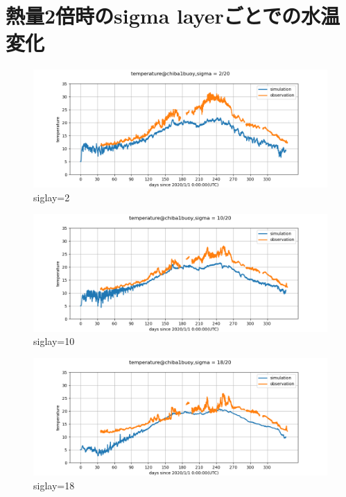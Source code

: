 \documentclass[12pt,a4paper]{jarticle}
\begin{document}
\newpage
\section{熱量2倍時のsigma layerごとでの水温変化}
\begin{figure}[hbtp]
    \centering
        \includegraphics[keepaspectratio,scale=0.5]{Tokyo3/temperature_chiba1buoy_2_Tokyo3.png}
    \caption{siglay=2}
\end{figure}

\begin{figure}[hbtp]
    \centering
        \includegraphics[keepaspectratio,scale=0.5]{Tokyo3/temperature_chiba1buoy_10_Tokyo3.png}
    \caption{siglay=10}
\end{figure}

\begin{figure}[hbtp]
    \centering
        \includegraphics[keepaspectratio,scale=0.5]{Tokyo3/temperature_chiba1buoy_18_Tokyo3.png}
    \caption{siglay=18}
\end{figure}

        
\end{document}
